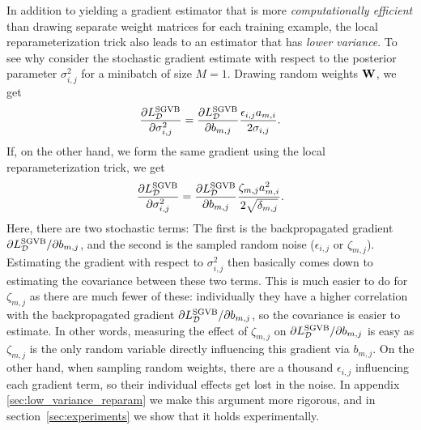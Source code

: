In addition to yielding a gradient estimator that is more \textit{computationally efficient} than drawing separate weight matrices for each training example, the local reparameterization trick also leads to an estimator that has \textit{lower variance}. To see why consider the stochastic gradient estimate with respect to the posterior parameter $\sigma^{2}_{i,j}$ for a minibatch of size $M=1$. Drawing random weights $\mathbf{W}$, we get
\begin{align}
\label{eq:stochest_weights}
\frac{\partial L_{\mathcal{D}}^\text{SGVB}}{\partial \sigma^{2}_{i,j}} = \frac{\partial L_{\mathcal{D}}^\text{SGVB}}{\partial b_{m,j}}\frac{\epsilon_{i,j}a_{m,i}}{2\sigma_{i,j}}.
\end{align}
If, on the other hand, we form the same gradient using the local reparameterization trick, we get
\begin{align}
\label{eq:stochest_local}
\frac{\partial L_{\mathcal{D}}^\text{SGVB}}{\partial \sigma^{2}_{i,j}} = \frac{\partial L_{\mathcal{D}}^\text{SGVB}}{\partial b_{m,j}}\frac{\zeta_{m,j}a_{m,i}^{2}}{2\sqrt{\delta_{m,j}}}.
\end{align}
Here, there are two stochastic terms: The first is the backpropagated gradient $\partial L_{\mathcal{D}}^\text{SGVB} / \partial b_{m,j}$, and the second is the sampled random noise ($\epsilon_{i,j}$ or $\zeta_{m,j}$). Estimating the gradient with respect to $\sigma^{2}_{i,j}$ then basically comes down to estimating the covariance between these two terms. This is much easier to do for $\zeta_{m,j}$ as there are much fewer of these: individually they have a higher correlation with the backpropagated gradient $\partial L_{\mathcal{D}}^\text{SGVB}/\partial b_{m,j}$, so the covariance is easier to estimate. In other words, measuring the effect of $\zeta_{m,j}$ on $\partial L_{\mathcal{D}}^\text{SGVB}/\partial b_{m,j}$ is easy as $\zeta_{m,j}$ is the only random variable directly influencing this gradient via $b_{m,j}$. On the other hand, when sampling random weights, there are a thousand $\epsilon_{i,j}$ influencing each gradient term, so their individual effects get lost in the noise. In appendix \ref{sec:low_variance_reparam} we make this argument more rigorous, and in section~\ref{sec:experiments} we show that it holds experimentally.


